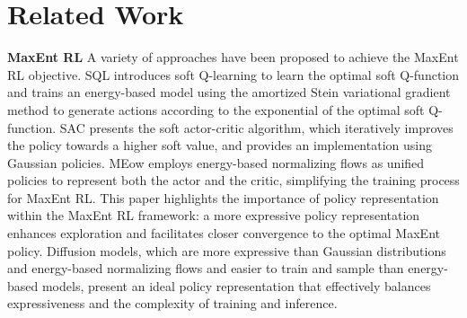 \section{Related Work}
\textbf{MaxEnt RL}
A variety of approaches have been proposed to achieve the MaxEnt RL objective. SQL \cite{haarnoja2017reinforcement} introduces soft Q-learning to learn the optimal soft Q-function and trains an energy-based model using the amortized Stein variational gradient method to generate actions according to the exponential of the optimal soft Q-function. SAC \cite{haarnoja2018soft} presents the soft actor-critic algorithm, which iteratively improves the policy towards a higher soft value, and provides an implementation using Gaussian policies. MEow \cite{chao2024maximum} employs energy-based normalizing flows as unified policies to represent both the actor and the critic, simplifying the training process for MaxEnt RL. This paper highlights the importance of policy representation within the MaxEnt RL framework: a more expressive policy representation enhances exploration and facilitates closer convergence to the optimal MaxEnt policy. Diffusion models, which are more expressive than Gaussian distributions and energy-based normalizing flows and easier to train and sample than energy-based models, present an ideal policy representation that effectively balances expressiveness and the complexity of training and inference.


